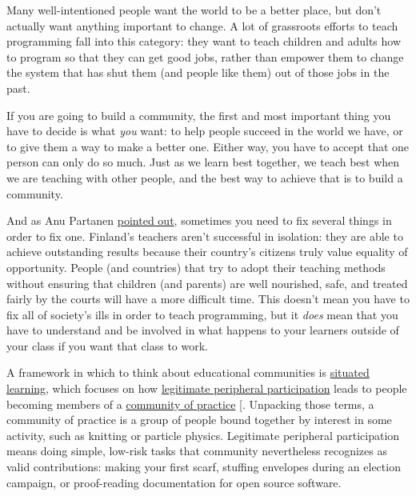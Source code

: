 Many well-intentioned people want the world to be a better place, but
don't actually want anything important to change. A lot of grassroots
efforts to teach programming fall into this category: they want to teach
children and adults how to program so that they can get good jobs,
rather than empower them to change the system that has shut them (and
people like them) out of those jobs in the past.

If you are going to build a community, the first and most important
thing you have to decide is what \emph{you} want: to help people succeed in
the world we have, or to give them a way to make a better one. Either
way, you have to accept that one person can only do so much. Just as we
learn best together, we teach best when we are teaching with other
people, and the best way to achieve that is to build a community.

And as Anu Partanen \href{https://www.theatlantic.com/national/archive/2011/12/what-americans-keep-ignoring-about-finlands-school-success/250564/}{pointed out}, sometimes
you need to fix several things in order to fix one. Finland's teachers
aren't successful in isolation: they are able to achieve outstanding
results because their country's citizens truly value equality of
opportunity. People (and countries) that try to adopt their teaching
methods without ensuring that children (and parents) are well
nourished, safe, and treated fairly by the courts will have a more
difficult time. This doesn't mean you have to fix all of society's
ills in order to teach programming, but it \emph{does} mean that you have
to understand and be involved in what happens to your learners outside
of your class if you want that class to work.

A framework in which to think about educational communities is
\protect\hyperlink{g:situated-learning}{situated learning}, which focuses on how
\protect\hyperlink{g:legitimate-peripheral-participation}{legitimate peripheral
participation} leads to people
becoming members of a \protect\hyperlink{g:community-of-practice}{community of
practice} {[}\protect[\hyperlink{b:Weng2015}{Weng2015}]{]}. Unpacking
those terms, a community of practice is a group of people bound
together by interest in some activity, such as knitting or particle
physics. Legitimate peripheral participation means doing simple,
low-risk tasks that community nevertheless recognizes as valid
contributions: making your first scarf, stuffing envelopes during an
election campaign, or proof-reading documentation for open source
software.

